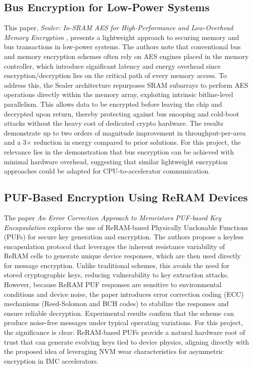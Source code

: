 \documentclass[sigconf,authoryear]{acmart}
\begin{document}
\subsection{Bus Encryption for Low-Power Systems}
This paper, \textit{Sealer: In-SRAM AES for High-Performance and Low-Overhead Memory Encryption} \cite{Sealer}, presents a lightweight
approach to securing memory and bus transactions in low-power systems. The authors note that conventional bus and memory encryption
schemes often rely on AES engines placed in the memory controller, which introduce significant latency and energy overhead since
encryption/decryption lies on the critical path of every memory access. To address this, the Sealer architecture repurposes SRAM
subarrays to perform AES operations directly within the memory array, exploiting intrinsic bitline-level parallelism. This allows
data to be encrypted before leaving the chip and decrypted upon return, thereby protecting against bus snooping and cold-boot attacks
without the heavy cost of dedicated crypto hardware. The results demonstrate up to two orders of magnitude improvement in throughput-per-area
and a 3$\times$ reduction in energy compared to prior solutions. For this project, the relevance lies in the demonstration that
bus encryption can be achieved with minimal hardware overhead, suggesting that similar lightweight encryption approaches
could be adapted for CPU-to-accelerator communication.

\subsection{PUF-Based Encryption Using ReRAM Devices}
The paper \textit{An Error Correction Approach to Memristors PUF-based Key Encapsulation} \cite{ReRAM_PUF} explores the use of
ReRAM-based Physically Unclonable Functions (PUFs) for secure key generation and encryption. The authors propose a keyless
encapsulation protocol that leverages the inherent resistance variability of ReRAM cells to generate unique device responses,
which are then used directly for message encryption. Unlike traditional schemes, this avoids the need for stored cryptographic
keys, reducing vulnerability to key extraction attacks. However, because ReRAM PUF responses are sensitive to environmental
conditions and device noise, the paper introduces error correction coding (ECC) mechanisms (Reed-Solomon and BCH codes) to
stabilize the responses and ensure reliable decryption. Experimental results confirm that the scheme can produce noise-free
messages under typical operating variations. For this project, the significance is clear: ReRAM-based PUFs provide a natural
hardware root of trust that can generate evolving keys tied to device physics, aligning directly with the proposed idea of
leveraging NVM wear characteristics for asymmetric encryption in IMC accelerators.
\end{document}
